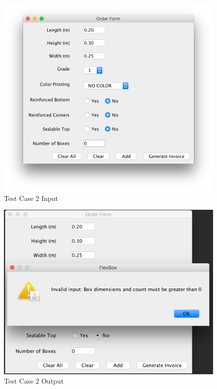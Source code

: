 \documentclass[12pt]{article}
\begin{document}
\begin{figure}[H]
	\includegraphics[width=\linewidth]{./screenshots/test_case_2_input.png}
	\caption{Test Case 2 Input}
	\label{test_case_2_input}
\end{figure}
\begin{figure}[H]
	\includegraphics[width=\linewidth]{./screenshots/test_case_2_output.png}
	\caption{Test Case 2 Output}
	\label{test_case_2_output}
\end{figure}
\end{document}
